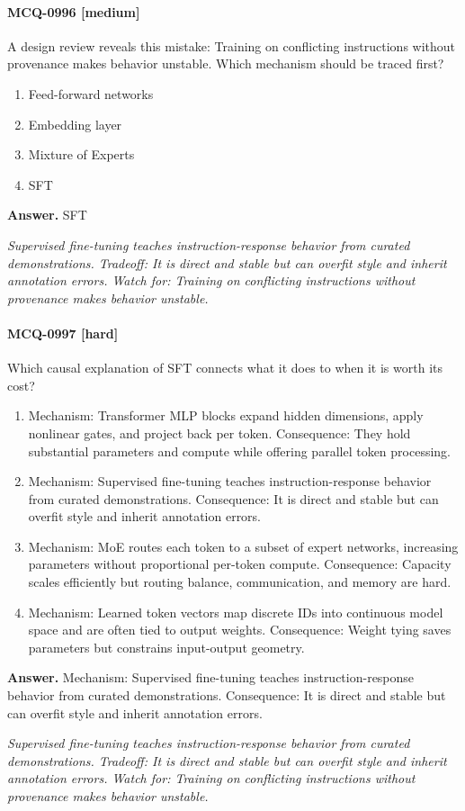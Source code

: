 \paragraph{MCQ-0996 [medium]} A design review reveals this mistake: Training on conflicting instructions without provenance makes behavior unstable. Which mechanism should be traced first?
\begin{enumerate}[label=\Alph*.]
\item Feed-forward networks
\item Embedding layer
\item Mixture of Experts
\item SFT
\end{enumerate}
\noindent\textbf{Answer.} SFT
\par\textit{Supervised fine-tuning teaches instruction-response behavior from curated demonstrations. Tradeoff: It is direct and stable but can overfit style and inherit annotation errors. Watch for: Training on conflicting instructions without provenance makes behavior unstable.}
\paragraph{MCQ-0997 [hard]} Which causal explanation of SFT connects what it does to when it is worth its cost?
\begin{enumerate}[label=\Alph*.]
\item Mechanism: Transformer MLP blocks expand hidden dimensions, apply nonlinear gates, and project back per token. Consequence: They hold substantial parameters and compute while offering parallel token processing.
\item Mechanism: Supervised fine-tuning teaches instruction-response behavior from curated demonstrations. Consequence: It is direct and stable but can overfit style and inherit annotation errors.
\item Mechanism: MoE routes each token to a subset of expert networks, increasing parameters without proportional per-token compute. Consequence: Capacity scales efficiently but routing balance, communication, and memory are hard.
\item Mechanism: Learned token vectors map discrete IDs into continuous model space and are often tied to output weights. Consequence: Weight tying saves parameters but constrains input-output geometry.
\end{enumerate}
\noindent\textbf{Answer.} Mechanism: Supervised fine-tuning teaches instruction-response behavior from curated demonstrations. Consequence: It is direct and stable but can overfit style and inherit annotation errors.
\par\textit{Supervised fine-tuning teaches instruction-response behavior from curated demonstrations. Tradeoff: It is direct and stable but can overfit style and inherit annotation errors. Watch for: Training on conflicting instructions without provenance makes behavior unstable.}
